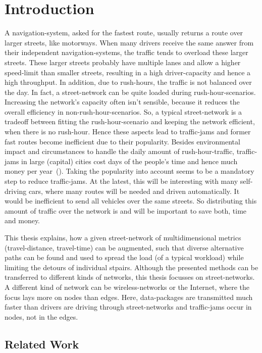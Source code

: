 \chapter{Introduction}
\label{chap:introduction}

A navigation-system, asked for the fastest route, usually returns a route over larger streets, like motorways.
When many drivers receive the same answer from their independent navigation-systems, the traffic tends to overload these larger streets.
These larger streets probably have multiple lanes and allow a higher speed-limit than smaller streets, resulting in a high driver-capacity and hence a high throughput.
In addition, due to rush-hours, the traffic is not balanced over the day.
In fact, a street-network can be quite loaded during rush-hour-scenarios.
Increasing the network's capacity often isn't sensible, because it reduces the overall efficiency in non-rush-hour-scenarios.
So, a typical street-network is a tradeoff between fitting the rush-hour-scenario and keeping the network efficient, when there is no rush-hour.
Hence these aspects lead to traffic-jams and former fast routes become inefficient due to their popularity.
Besides environmental impact and circumstances to handle the daily amount of rush-hour-traffic, traffic-jams in large (capital) cities cost days of the people's time and hence much money per year~(\cite{inrix:traffic-cost}).
Taking the popularity into account seems to be a mandatory step to reduce traffic-jams.
At the latest, this will be interesting with many self-driving cars, where many routes will be needed and driven automatically.
It would be inefficient to send all vehicles over the same streets.
So distributing this amount of traffic over the network is and will be important to save both, time and money.

This thesis explains, how a given street-network of multidimensional \glspl{metric} (travel-distance, travel-time) can be augmented, such that diverse alternative paths can be found and used to spread the load (of a typical workload) while limiting the detours of individual \glspl{stpair}.
Although the presented methods can be transferred to different kinds of networks, this thesis focusses on street-networks.
A different kind of network can be wireless-networks or the Internet, where the focus lays more on nodes than edges.
Here, data-packages are transmitted much faster than drivers are driving through street-networks and traffic-jams occur in nodes, not in the edges.

\section{Related Work}

